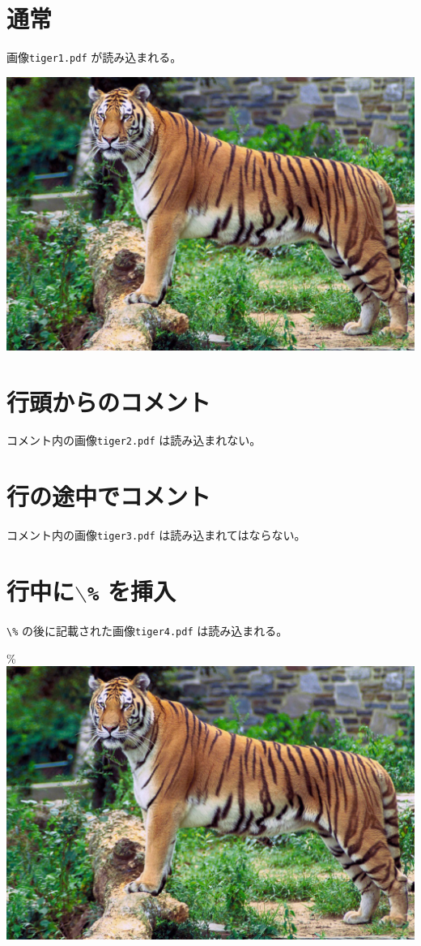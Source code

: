 \documentclass{jsarticle}
\begin{document}
\section{通常}
画像\texttt{tiger1.pdf} が読み込まれる。

\includegraphics[width=15cm]{tiger1.pdf}

\section{行頭からのコメント}
コメント内の画像\texttt{tiger2.pdf} は読み込まれない。


\section{行の途中でコメント}
コメント内の画像\texttt{tiger3.pdf} は読み込まれてはならない。%

\section[行中に\%を挿入]{行中に\texttt{$\backslash$\%} を挿入}
\verb|\%| の後に記載された画像\texttt{tiger4.pdf} は読み込まれる。

\% \includegraphics[width=15cm]{tiger4.pdf}
\end{document}
